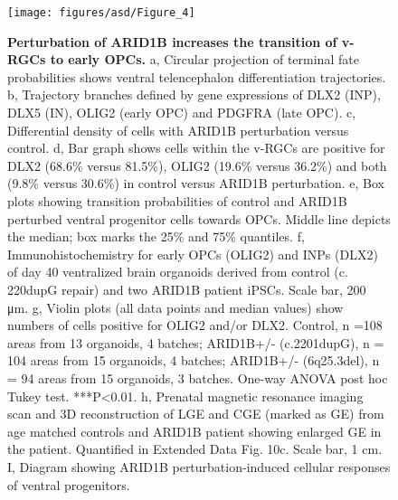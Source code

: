 \begin{figure}[b!]
    \centering
	\texttt{[image: figures/asd/Figure\_4]}
    \caption{\textbf{Perturbation of ARID1B increases the transition of v-RGCs to early OPCs.}
    a, Circular projection of terminal fate probabilities shows ventral telencephalon differentiation trajectories. b, Trajectory branches defined by gene expressions of DLX2 (INP), DLX5 (IN), OLIG2 (early OPC) and PDGFRA (late OPC). c, Differential density of cells with ARID1B perturbation versus control. d, Bar graph shows cells within the v-RGCs are positive for DLX2 (68.6\% versus 81.5\%), OLIG2 (19.6\% versus 36.2\%) and both (9.8\% versus 30.6\%) in control versus ARID1B perturbation. e, Box plots showing transition probabilities of control and ARID1B perturbed ventral progenitor cells towards OPCs. Middle line depicts the median; box marks the 25\% and 75\% quantiles. f, Immunohistochemistry for early OPCs (OLIG2) and INPs (DLX2) of day 40 ventralized brain organoids derived from control (c. 220dupG repair) and two ARID1B patient iPSCs. Scale bar, 200 μm. g, Violin plots (all data points and median values) show numbers of cells positive for OLIG2 and/or DLX2. Control, n =108 areas from 13 organoids, 4 batches; ARID1B+/- (c.2201dupG), n = 104 areas from 15 organoids, 4 batches; ARID1B+/- (6q25.3del), n = 94 areas from 15 organoids, 3 batches. One-way ANOVA post hoc Tukey test. ***P<0.01. h, Prenatal magnetic resonance imaging scan and 3D reconstruction of LGE and CGE (marked as GE) from age matched controls and ARID1B patient showing enlarged GE in the patient. Quantified in Extended Data Fig. 10c. Scale bar, 1 cm. I, Diagram showing ARID1B perturbation-induced cellular responses of ventral progenitors.}
    \label{fig:asd4}
\end{figure}

